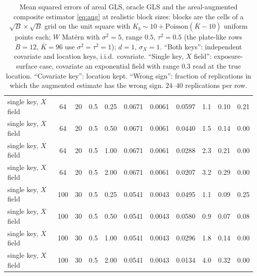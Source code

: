 \documentclass[11pt]{article}
\theoremstyle{definition}
\begin{document}
\begin{table}[t]
\begin{tabular}{lcccc rrr rrr}
single key, $X$ field & 64 & 20 & 0.5 & 0.25 & 0.0671 & 0.0061 & 0.0597 & 1.1 & 0.10 & 0.21\\
single key, $X$ field & 64 & 20 & 0.5 & 0.50 & 0.0671 & 0.0061 & 0.0440 & 1.5 & 0.14 & 0.00\\
single key, $X$ field & 64 & 20 & 0.5 & 1.00 & 0.0671 & 0.0061 & 0.0288 & 2.3 & 0.21 & 0.00\\
single key, $X$ field & 64 & 20 & 0.5 & 2.00 & 0.0671 & 0.0061 & 0.0207 & 3.2 & 0.29 & 0.00\\
single key, $X$ field & 100 & 30 & 0.5 & 0.25 & 0.0541 & 0.0043 & 0.0495 & 1.1 & 0.09 & 0.25\\
single key, $X$ field & 100 & 30 & 0.5 & 0.50 & 0.0541 & 0.0043 & 0.0580 & 0.9 & 0.07 & 0.08\\
single key, $X$ field & 100 & 30 & 0.5 & 1.00 & 0.0541 & 0.0043 & 0.0296 & 1.8 & 0.14 & 0.00\\
single key, $X$ field & 100 & 30 & 0.5 & 2.00 & 0.0541 & 0.0043 & 0.0134 & 4.0 & 0.32 & 0.00\\
\bottomrule
\end{tabular}
\caption{Mean squared errors of areal GLS, oracle GLS and the areal-augmented composite estimator \eqref{eq:aug} at realistic block sizes: blocks are the cells of a $\sqrt B\times\sqrt B$ grid on the unit square with $K_b\sim10+\mathrm{Poisson}(\bar K-10)$ uniform points each; $W$ Mat\'ern with $\sigma^2=5$, range $0.5$, $\tau^2=0.5$ (the plate-like rows $B=12$, $\bar K=96$ use $\sigma^2=\tau^2=1$); $d=1$, $\sigma_X=1$. ``Both keys'': independent covariate and location keys, i.i.d.\ covariate. ``Single key, $X$ field'': exposure-surface case, covariate an exponential field with range $0.3$ read at the true location. ``Covariate key'': location kept. ``Wrong sign'': fraction of replications in which the augmented estimate has the wrong sign. $24$--$40$ replications per row.}
\label{tab:realistic}
\end{table}
\end{document}
